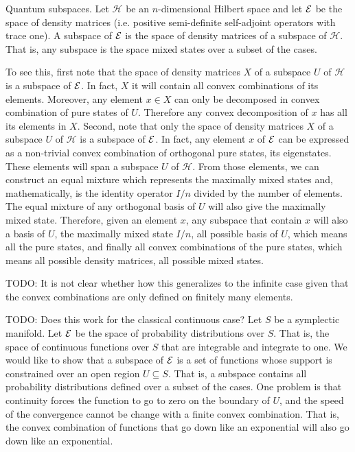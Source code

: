 \begin{example} Quantum subspaces.
	Let $\mathcal{H}$ be an $n$-dimensional Hilbert space and let $\mathcal{E}$ be the space of density matrices (i.e. positive semi-definite self-adjoint operators with trace one). A subspace of $\mathcal{E}$ is the space of density matrices of a subspace of $\mathcal{H}$. That is, any subspace is the space mixed states over a subset of the cases.
	
	To see this, first note that the space of density matrices $X$ of a subspace $U$ of $\mathcal{H}$ is a subspace of $\mathcal{E}$. In fact, $X$ it will contain all convex combinations of its elements. Moreover, any element $x \in X$ can only be decomposed in convex combination of pure states of $U$. Therefore any convex decomposition of $x$ has all its elements in $X$. Second, note that only the space of density matrices $X$ of a subspace $U$ of $\mathcal{H}$ is a subspace of $\mathcal{E}$. In fact, any element $x$ of $\mathcal{E}$ can be expressed as a non-trivial convex combination of orthogonal pure states, its eigenstates. These elements will span a subspace $U$ of $\mathcal{H}$. From those elements, we can construct an equal mixture which represents the maximally mixed states and, mathematically, is the identity operator $I/n$ divided by the number of elements. The equal mixture of any orthogonal basis of $U$ will also give the maximally mixed state. Therefore, given an element $x$, any subspace that contain $x$ will also a basis of $U$, the maximally mixed state $I/n$, all possible basis of $U$, which means all the pure states, and finally all convex combinations of the pure states, which means all possible density matrices, all possible mixed states.
	
	TODO: It is not clear whether how this generalizes to the infinite case given that the convex combinations are only defined on finitely many elements.
\end{example}

\begin{remark}
	TODO: Does this work for the classical continuous case? Let $S$ be a symplectic manifold. Let $\mathcal{E}$ be the space of probability distributions over $S$. That is, the space of continuous functions over $S$ that are integrable and integrate to one. We would like to show that a subspace of $\mathcal{E}$ is a set of functions whose support is constrained over an open region $U \subseteq S$. That is, a subspace contains all probability distributions defined over a subset of the cases. One problem is that continuity forces the function to go to zero on the boundary of $U$, and the speed of the convergence cannot be change with a finite convex combination. That is, the convex combination of functions that go down like an exponential will also go down like an exponential.
\end{remark}

